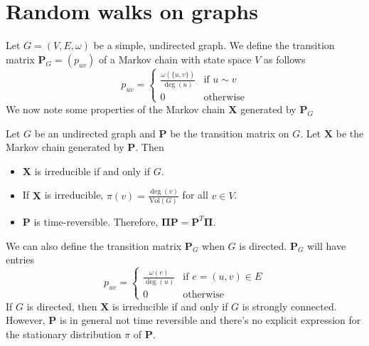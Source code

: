 \section{Random walks on graphs}
\label{sec:random-walks-graphs}
Let $G = (V,E,\omega)$ be a simple, undirected graph. We define the transition
matrix $\mathbf{P}_G = (p_{uv})$ of a Markov chain with state space $V$ as follows
\begin{equation}
  \label{eq:20}
  p_{uv} = \begin{cases}
    \tfrac{\omega(\{u,v\})}{\deg(u)} & \text{if $u \sim v$} \\
    0 & \text{otherwise}
  \end{cases}
\end{equation}
We now note some properties of the Markov chain $\mathbf{X}$ generated
by $\mathbf{P}_G$
\begin{proposition}
  \label{prop:15}
  Let $G$ be an undirected graph and $\mathbf{P}$ be the transition
  matrix on $G$. Let $\mathbf{X}$ be the Markov chain generated by
  $\mathbf{P}$. Then 
\begin{itemize}
\item $\mathbf{X}$ is irreducible if and only if $G$.
\item If $\mathbf{X}$ is irreducible, $\pi(v) =
  \tfrac{\deg(v)}{\mathrm{Vol}(G)}$ for all $v \in V$.
\item $\mathbf{P}$ is time-reversible. Therefore, $\bm{\Pi}\mathbf{P} = \mathbf{P}^{T}\bm{\Pi}$.
\end{itemize}
\end{proposition}
%
We can also define the transition matrix $\mathbf{P}_G$ when $G$ is
directed. $\mathbf{P}_G$ will have entries
\begin{equation}
  \label{eq:18}
  p_{uv} = \begin{cases}
    \tfrac{\omega(e)}{\deg(u)} & \text{if $e = (u,v) \in E$} \\
    0 & \text{otherwise}
  \end{cases}
\end{equation}
If $G$ is directed, then $\mathbf{X}$ is irreducible if and only if
$G$ is strongly connected. However, $\mathbf{P}$ is in general not
time reversible and there's no explicit expression for the
stationary distribution $\pi$ of $\mathbf{P}$.

